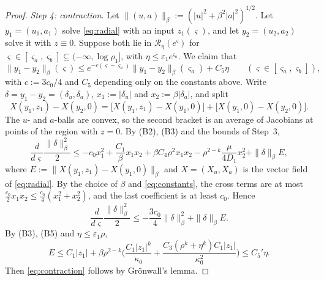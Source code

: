 \documentclass[11pt]{article}
\theoremstyle{definition}
\theoremstyle{remark}
\numberwithin{equation}{section}
\newcommand{\cR}{\mathcal{R}}
\newcommand{\eps}{\varepsilon}
\begin{document}
\begin{proof}
\emph{Step 4: contraction.} Let $\|(u,a)\|_\beta:=(|u|^2+\beta^2|a|^2)^{1/2}$. Let $y_1=(u_1,a_1)$ solve \eqref{eq:radial} with an input $z_1(\varsigma)$, and let $y_2=(u_2,a_2)$ solve it with $z\equiv0$. Suppose both lie in $\cR_\eta(e^\varsigma)$ for $\varsigma\in[\varsigma_a,\varsigma_b]\subseteq(-\infty,\log\rho_1]$, with $\eta\le\eps_1e^{\varsigma_a}$. We claim that
\begin{equation}\label{eq:contraction}
\|y_1-y_2\|_\beta(\varsigma)\le e^{-c(\varsigma-\varsigma_a)}\|y_1-y_2\|_\beta(\varsigma_a)+C_5\eta\qquad(\varsigma\in[\varsigma_a,\varsigma_b]),
\end{equation}
with $c:=3c_0/4$ and $C_5$ depending only on the constants above. Write $\delta=y_1-y_2=(\delta_u,\delta_a)$, $x_1:=|\delta_u|$ and $x_2:=\beta|\delta_a|$, and split
\[
X(y_1,z_1)-X(y_2,0)=\big[X(y_1,z_1)-X(y_1,0)\big]+\big[X(y_1,0)-X(y_2,0)\big].
\]
The $u$- and $a$-balls are convex, so the second bracket is an average of Jacobians at points of the region with $z=0$. By (B2), (B3) and the bounds of Step~3,
\[
\frac{d}{d\varsigma}\frac{\|\delta\|_\beta^2}2\le-c_0x_1^2+\frac{C_1}{\beta}x_1x_2+\beta C_4\rho^2x_1x_2-\rho^{2-k}\frac{\mu}{4D_1}x_2^2+\|\delta\|_\beta E,
\]
where $E:=\|X(y_1,z_1)-X(y_1,0)\|_\beta$ and $X=(X_u,X_a)$ is the vector field of \eqref{eq:radial}. By the choice of $\beta$ and \eqref{eq:constants}, the cross terms are at most $\frac{c_0}2x_1x_2\le\frac{c_0}4(x_1^2+x_2^2)$, and the last coefficient is at least $c_0$. Hence
\[
\frac{d}{d\varsigma}\frac{\|\delta\|_\beta^2}2\le-\frac{3c_0}4\|\delta\|_\beta^2+\|\delta\|_\beta E .
\]
By (B3), (B5) and $\eta\le\eps_1\rho$,
\[
E\le C_1|z_1|+\beta\rho^{2-k}\Big(\frac{C_1|z_1|^k}{\kappa_0}+\frac{C_3(\rho^k+\eta^k)C_1|z_1|}{\kappa_0^2}\Big)\le C_5'\eta .
\]
Then \eqref{eq:contraction} follows by Grönwall's lemma.


\end{proof}
\end{document}
